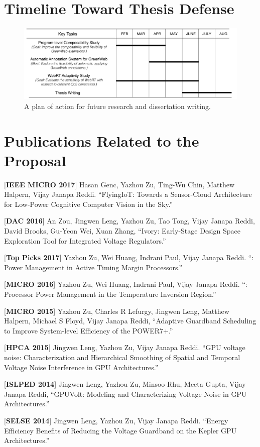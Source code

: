 
\setcounter{secnumdepth}{0}

\section{Timeline Toward Thesis Defense}

\begin{figure}[h]
  \centering
  \captionsetup{width=\columnwidth}
  \includegraphics[trim=0 0 0 0, clip, width=.9\columnwidth]{graphs/timeline.pdf}
  \caption{\small{A plan of action for future research and dissertation writing.}}
  \label{fig:timeline}
\end{figure}

\section{Publications Related to the Proposal}
[\textbf{IEEE MICRO 2017}] Hasan Genc, Yazhou Zu, Ting-Wu Chin, Matthew Halpern, Vijay Janapa Reddi. ``FlyingIoT: Towards a Sensor-Cloud Architecture for Low-Power Cognitive Computer Vision in the Sky.''

[\textbf{DAC 2016}] An Zou, Jingwen Leng, Yazhou Zu, Tao Tong, Vijay Janapa Reddi, David Brooks, Gu-Yeon Wei, Xuan Zhang, ``Ivory: Early-Stage Design Space Exploration Tool for Integrated Voltage Regulators.''

[\textbf{Top Picks 2017}] Yazhou Zu, Wei Huang, Indrani Paul, Vijay Janapa Reddi. ``\tistates: Power Management in Active Timing Margin Processors.''

[\textbf{MICRO 2016}] Yazhou Zu, Wei Huang, Indrani Paul, Vijay Janapa Reddi. ``\tistates: Processor Power Management in the Temperature Inversion Region.''

[\textbf{MICRO 2015}] Yazhou Zu, Charles R Lefurgy, Jingwen Leng, Matthew Halpern, Michael S Floyd, Vijay Janapa Reddi, ``Adaptive Guardband Scheduling to Improve System-level Efficiency of the POWER7+.''

[\textbf{HPCA 2015}] Jingwen Leng, Yazhou Zu, Vijay Janapa Reddi. ``GPU voltage noise: Characterization and Hierarchical Smoothing of Spatial and Temporal Voltage Noise Interference in GPU Architectures.''

[\textbf{ISLPED 2014}] Jingwen Leng, Yazhou Zu, Minsoo Rhu, Meeta Gupta, Vijay Janapa Reddi, ``GPUVolt: Modeling and Characterizing Voltage Noise in GPU Architectures.''

[\textbf{SELSE 2014}] Jingwen Leng, Yazhou Zu, Vijay Janapa Reddi. ``Energy Efficiency Benefits of Reducing the Voltage Guardband on the Kepler GPU Architectures.''